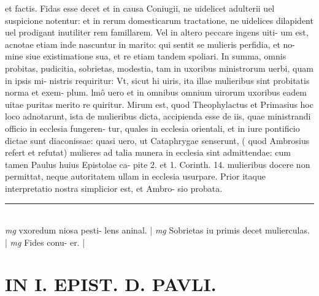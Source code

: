 \documentclass{article}
\begin{document}
\begin{pages}
et factis. Fidas esse decet et in causa Coniugii, ne uidelicet adulterii uel suspicione notentur: et in rerum domesticarum tractatione, ne uidelices dilapident uel prodigant inutiliter rem famillarem. Vel in altero peccare ingens uiti- um est, acnotae etiam inde nascuntur in marito: qui sentit se mulieris perfidia, et no- mine siue existimatione sua, et re etiam tandem spoliari. In summa, omnis probitas, pudicitia, sobrietas, modestia, tam in uxoribus ministrorum uerbi, quam in ipsis mi- nistris requiritur: Vt, sicut hi uiris, ita illae mulieribus sint probitatis norma et exem- plum. lmô uero et in omnibus omnium uirorum uxoribus eadem uitae puritas merito re quiritur. Mirum est, quod Theophylactus et Primasius hoc loco adnotarunt, ista de mulieribus dicta, accipienda esse de iis, quae ministrandi officio in ecclesia fungeren- tur, quales in ecclesia orientali, et in iure pontificio dictae sunt diaconissae: quasi uero, ut Cataphrygae senserunt, ( quod Ambrosius refert et refutat) mulieres ad talia munera in ecclesia sint admittendae: cum tamen Paulus huius Epistolae ca- pite 2. et 1. Corinth. 14. mulieribus docere non permittat, neque autoritatem ullam in ecclesia usurpare. Prior itaque interpretatio nostra simplicior est, et Ambro- sio probata.  \pend
\vspace{0.5cm}\noindent
\vspace{0.2cm}\rule{1cm}{0.2pt}\\ 
\hspace{0.2cm}\textit{mg}
\footnotesize vxoredum niosa pesti- lens aninal. 
\normalsize| 
\hspace{0.2cm}\textit{mg}
\footnotesize Sobrietas iu primis decet mulierculas. 
\normalsize| 
\hspace{0.2cm}\textit{mg}
\footnotesize Fides conu- er. 
\normalsize| 
\section*{IN I. EPIST. D. PAVLI. }
\marginpar{[ p.86 ]}
{}

\end{pages}
\end{document}
